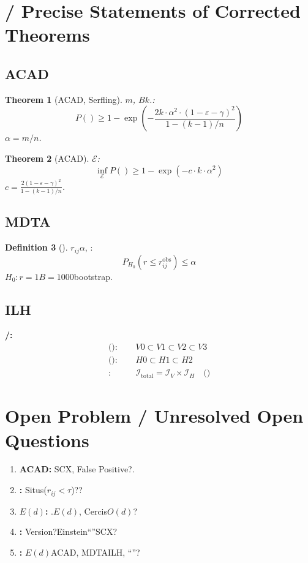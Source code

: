 \documentclass[11pt,a4paper]{article}
\theoremstyle{plain}
\newtheorem{theorem}{Theorem}[section]
\theoremstyle{definition}
\newtheorem{definition}[theorem]{Definition}
\theoremstyle{remark}
\newcommand{\cI}{\mathcal{I}}
\begin{document}
{\section{ / Precise Statements of Corrected Theorems}
\label{app:corrected}
\subsection{ACAD}
\begin{theorem}[ACAD, Serfling]
$m$, $B$$k$.: 
\begin{equation}
 P(\text{}) \geq 1 - \exp\left(-\frac{2k \cdot \alpha^2 \cdot (1 - \varepsilon - \gamma)^2}{1 - (k-1)/n}\right)
\end{equation}
$\alpha = m/n$.
\end{theorem}
\begin{theorem}[ACAD]
$\mathcal{E}$: 
\begin{equation}
 \inf_{\mathcal{E}} P(\text{}) \geq 1 - \exp\left(-c \cdot k \cdot \alpha^2\right)
\end{equation}
$c = \frac{2(1 - \varepsilon - \gamma)^2}{1 - (k-1)/n}$.
\end{theorem}
\subsection{MDTA}
\begin{definition}[]
$r_{ij}$$\alpha$, : 
\begin{equation}
 P_{H_0}(r \leq r_{ij}^{\text{obs}}) \leq \alpha
\end{equation}
$H_0: r = 1$$B = 1000$bootstrap.
\end{definition}
\subsection{ILH}
\textbf{/: }
\begin{align}
 \text{(): }&\quad V0 \subset V1 \subset V2 \subset V3 \\
 \text{(): }&\quad H0 \subset H1 \subset H2 \\
 \text{: }&\quad \cI_{\text{total}} = \cI_V \times \cI_H \quad \text{()}
\end{align}
\section{Open Problem / Unresolved Open Questions}
\label{app:open}
\begin{enumerate}[leftmargin=*]
 \item \textbf{ACAD: } SCX, False Positive?.
 \item \textbf{: } Situs($r_{ij} < \tau$)??
 \item \textbf{$E(d)$: }.$E(d)$, Cercis$O(d)$?
 \item \textbf{: } Version?Einstein``''SCX?
 \item \textbf{: } $E(d)$ACAD, MDTAILH, ``''?
\end{enumerate}
}
\end{document}
